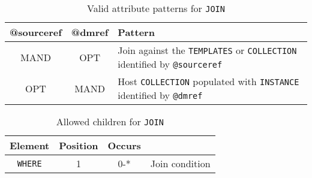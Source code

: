 \begin{table}[!htbp]
\small
\centering
\begin{tabulary}{\linewidth}{|c|c|J|}
    \hline 
        \textbf{@sourceref } &
        \textbf{@dmref} &
        \textbf{Pattern}\\
    \hline      \hline  
        MAND &           
        OPT &           
        Join against the \texttt{TEMPLATES} or \texttt{COLLECTION} identified by \texttt{@sourceref}  \\  
    \hline   
        OPT &           
        MAND &      
        Host \texttt{COLLECTION} populated with \texttt{INSTANCE}  identified by \texttt{@dmref} \\
   \hline 
\end{tabulary}
     \caption{Valid attribute patterns for  \texttt{JOIN}}
     \label{tbl:join-pattern}
\end{table}


\begin{table}[!htbp]
\small
\centering
\begin{tabulary}{\linewidth}{|c |c |c|J|}
    \hline 
        \textbf{Element} &
        \textbf{Position} &
        \textbf{Occurs} &
        \\
    \hline      \hline  
        \texttt{WHERE}  &        
        1 &           
        0-* &
         Join condition\\
    \hline 
\end{tabulary}
     \caption{Allowed children for \texttt{JOIN}} 
     \label{tbl:join-chidlren}
 \end{table}
